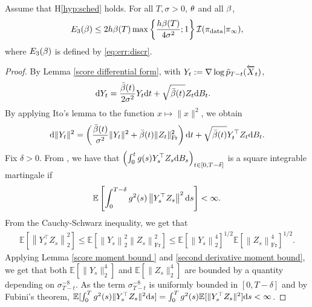 \documentclass[english,graybox,envcountchap,envcountsame,sectrefs,shortlabels]{svmono}
\theoremstyle{style}
\newcommand{\eqsp}{}
\begin{document}
\begin{lemma}
\label{lem:fish}
Assume that H\ref{hyp:sched} holds. For all $T,\sigma>0$, $\theta$ and all $\beta$,
    \begin{align*}
    E_3(\sched) \leq 2 h  \beta (T) \max \left\{ \frac{  h  \beta (T)  }{ 4 \sigma^2} ; 1  \right\} \mathcal{I}(\pi_{\rm data} | \pi_{\infty})   \eqsp,
    \end{align*}
    where $E_3(\beta)$ is defined by \eqref{eq:err:discr}.
\end{lemma}

\begin{proof}
By Lemma \ref{score differential form},  with $Y_t := \nabla \log \tilde p_{T-t} (\overleftarrow X_t)$,
\begin{align*}
\rmd Y_t &= \frac{ \bar \sched(t)}{2 \sigma^2} Y_t \rmd t + \sqrt{\bar \sched(t)} Z_t \rmd B_t\eqsp. 
\end{align*}
By applying  Ito's lemma to the function $x \mapsto \|x\|^2$, we obtain
\begin{align*}
\rmd \|Y_t\|^2 = \left(\frac{\bar \sched (t)}{\sigma^2} \|Y_t\|^2 + \bar \sched (t) \|Z_t\|_{\mathrm{Fr}}^2 \right) \rmd t + \sqrt{\bar \sched (t)} Y_t^\top Z_t \rmd B_t\eqsp.
\end{align*}
Fix $\delta>0$.
From \cite[Theorem~7.3, p.193]{baldi}, we have that $\left( \int_0^t g(s) Y_s^\top Z_s \mathrm{d} B_s\right)_{t \in [0,T-\delta]}$ is a square integrable martingale if 
\begin{align*}
\mathbb{E} \left[ \int_0^{T-\delta} g^2(s) \left\| Y_s^\top Z_s \right\|^2 \rmd s \right] < \infty\eqsp .
\end{align*}
From the Cauchy-Schwarz inequality, we get that 
\begin{align*}
    \mathbb{E} \left[ \left\| Y_s^\top Z_s \right\|^2_2 \right]
     \leq
    \mathbb{E} \left[ \left\| Y_s \right\|_2^2   \left\| Z_s \right\|_{\mathrm{Fr}}^2 \right] 
    \leq
    \mathbb{E} \left[ \left\| Y_s \right\|_2^4 \right]^{1/2}  \mathbb{E} \left[ \left\| Z_s \right\|_{\mathrm{Fr}}^4 \right]^{1/2}\eqsp .
\end{align*}
Applying Lemma \ref{score moment bound } and \ref{second derivative moment bound}, we get that both $\mathbb{E} [ \| Y_s \|_2^4 ]$ and $\mathbb{E} [ \| Z_s \|_2^4 ]$ are bounded by a quantity depending on $\sigma_{T-t}^{-8}$. As the term $\sigma_{T-t}^{-8}$ is uniformly bounded in $[0,T-\delta]$ and by Fubini's theorem, $\mathbb{E} [ \int_0^T g^2(s) \| Y_s^\top Z_s \|^2 \mathrm{d} s ]  =  \int_0^T g^2(s) \mathbb{E} [ \| Y_s^\top Z_s \|^2]   \mathrm{d} s < \infty$.  

\end{proof}
\end{document}

